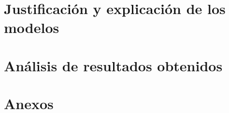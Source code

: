 \documentclass[12pt,a4paper]{article}
\begin{document}
\section{Justificación y explicación de los modelos}
% 

\section{Análisis de resultados obtenidos}




\appendix
\section{Anexos}
\end{document}
